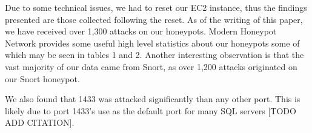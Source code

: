 Due to some technical issues, we had to reset our EC2 instance, thus the findings presented are those collected following the reset. As of the writing of this paper, we have received over 1,300 attacks on our honeypots. Modern Honeypot Network provides some useful high level statistics about our honeypots some of which may be seen in tables 1 and 2. Another interesting observation is that the vast majority of our data came from Snort, as over 1,200 attacks originated on our Snort honeypot.

We also found that 1433 was attacked significantly than any other port. This is likely due to port 1433's use as the default port for many SQL servers [TODO ADD CITATION].


\begin{table}[H]
\caption{Top Five Individual Detected IP Addresses} \label{tab:ips}
\end{table}

\begin{table}[H]
\caption{Top Five Attacked Ports} \label{tab:ports}
\end{table}

